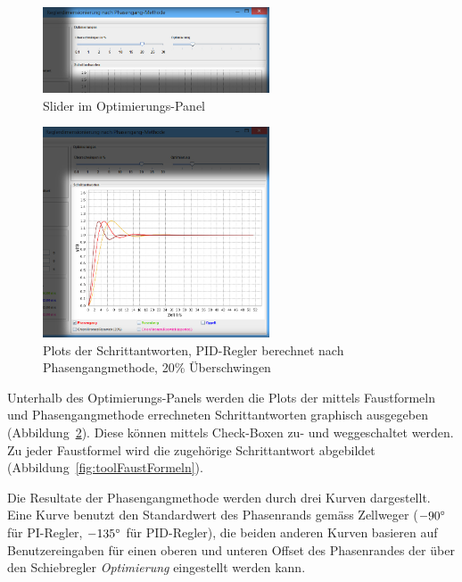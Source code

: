 \begin{figure}[h!, width=\pagewidth]
    \centering
    \includegraphics[width=0.6\textwidth]{images/tool20UeberschwingenPIDOptimierungen.jpg}
    \caption{Slider im Optimierungs-Panel}
    \label{fig:optimierungen}
\end{figure}

\begin{figure}[h!, width=\pagewidth]
    \centering
    \includegraphics[width=0.6\textwidth]{images/tool20UeberschwingenPIDPlots.jpg}
    \caption{Plots der Schrittantworten, PID-Regler berechnet nach Phasengangmethode, 20\% \"Uberschwingen}
    \label{fig:tool20Plots}
\end{figure}

Unterhalb   des    Optimierungs-Panels   werden   die   Plots    der   mittels
Faustformeln     und     Phasengangmethode    errechneten     Schrittantworten
graphisch    ausgegeben   (Abbildung~\ref{fig:tool20Plots}). Diese    k\"onnen
mittels    Check-Boxen     zu-    und    weggeschaltet     werden. Zu    jeder
Faustformel     wird     die    zugeh\"orige     Schrittantwort     abgebildet
(Abbildung~\ref{fig:toolFaustFormeln}).

Die Resultate der Phasengangmethode werden durch drei Kurven dargestellt. Eine
Kurve   benutzt   den   Standardwert  des   Phasenrands   gem\"ass   Zellweger
($-90\degree$  f\"ur PI-Regler,  $-135\degree$ f\"ur  PID-Regler), die  beiden
anderen Kurven  basieren auf Benutzereingaben  f\"ur einen oberen  und unteren
Offset  des  Phasenrandes  der   \"uber  den  Schiebregler  \emph{Optimierung}
eingestellt werden kann.

